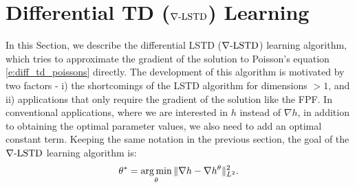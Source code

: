 \section{Differential TD ($\nabla\text{-LSTD}$) Learning}
In this Section, we describe the differential LSTD ($\nabla\text{-LSTD}$) learning algorithm, which tries to approximate the gradient of the solution to Poisson's equation \eqref{e:diff_td_poissons} directly. The development of this algorithm is motivated by two factors - i) the shortcomings of the LSTD algorithm for dimensions $>1$, and ii) applications that only require the gradient of the solution like the FPF. In conventional applications, where we are interested in $h$ instead of $\nabla h$, in addition to obtaining the optimal parameter values, we also need to add an optimal constant term. Keeping the same notation in the previous section, the goal of the $\nabla\text{-LSTD}$ learning algorithm is:
\begin{equation}
\param^* = \argmin_\param \| \grad h -\grad h^\param\|^2_{L^2}.
\label{e:diff_td_gradTD_norm_error}
\end{equation}

